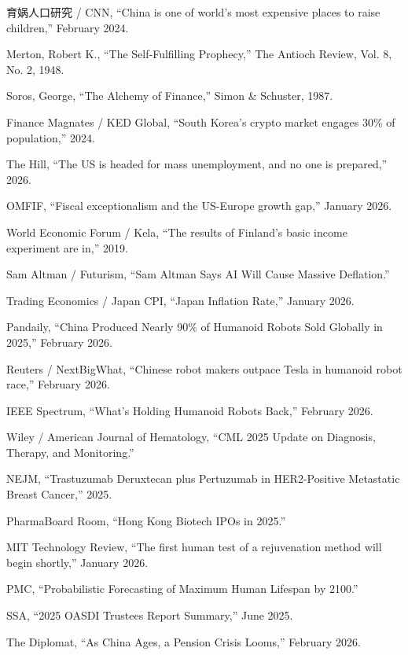 \documentclass[11pt,a4paper]{ctexart}
\begin{document}
\noindent [27] 育娲人口研究 / CNN, ``China is one of world's most expensive places to raise children,'' February 2024.

\noindent [28] Merton, Robert K., ``The Self-Fulfilling Prophecy,'' The Antioch Review, Vol. 8, No. 2, 1948.

\noindent [29] Soros, George, ``The Alchemy of Finance,'' Simon \& Schuster, 1987.

\noindent [30] Finance Magnates / KED Global, ``South Korea's crypto market engages 30\% of population,'' 2024.

\noindent [31] The Hill, ``The US is headed for mass unemployment, and no one is prepared,'' 2026.

\noindent [32] OMFIF, ``Fiscal exceptionalism and the US-Europe growth gap,'' January 2026.

\noindent [33] World Economic Forum / Kela, ``The results of Finland's basic income experiment are in,'' 2019.

\noindent [34] Sam Altman / Futurism, ``Sam Altman Says AI Will Cause Massive Deflation.''

\noindent [35] Trading Economics / Japan CPI, ``Japan Inflation Rate,'' January 2026.

\noindent [36] Pandaily, ``China Produced Nearly 90\% of Humanoid Robots Sold Globally in 2025,'' February 2026.

\noindent [37] Reuters / NextBigWhat, ``Chinese robot makers outpace Tesla in humanoid robot race,'' February 2026.

\noindent [38] IEEE Spectrum, ``What's Holding Humanoid Robots Back,'' February 2026.

\noindent [39] Wiley / American Journal of Hematology, ``CML 2025 Update on Diagnosis, Therapy, and Monitoring.''

\noindent [40] NEJM, ``Trastuzumab Deruxtecan plus Pertuzumab in HER2-Positive Metastatic Breast Cancer,'' 2025.

\noindent [41] PharmaBoard Room, ``Hong Kong Biotech IPOs in 2025.''

\noindent [42] MIT Technology Review, ``The first human test of a rejuvenation method will begin shortly,'' January 2026.

\noindent [43] PMC, ``Probabilistic Forecasting of Maximum Human Lifespan by 2100.''

\noindent [44] SSA, ``2025 OASDI Trustees Report Summary,'' June 2025.

\noindent [45] The Diplomat, ``As China Ages, a Pension Crisis Looms,'' February 2026.
\end{document}
